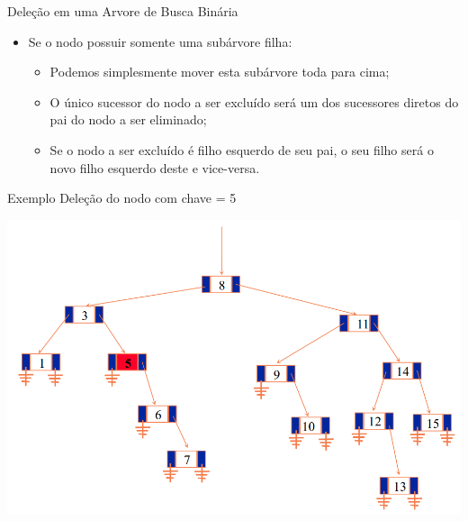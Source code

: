 \documentclass[12pt,table,xcolor={dvipsnames}]{beamer}
\begin{document}
\begin{frame}[fragile]{Deleção em uma Arvore de Busca Binária}
          \begin{itemize}
          \item Se o nodo possuir somente uma subárvore filha:
		  \begin{itemize}
		  \item Podemos simplesmente mover esta subárvore toda para cima;
		  \item O único sucessor do nodo a ser excluído será um dos sucessores diretos do pai do nodo a ser eliminado;
		  \item Se o nodo a ser excluído é filho esquerdo de seu pai, o seu filho será o novo filho esquerdo deste e vice-versa.
		  \end{itemize}
       	  \end{itemize}
\end{frame}

\begin{frame}[fragile]{Exemplo}
Deleção do nodo com chave = 5
\begin{center}
\includegraphics[scale=.3]{arv10.png} 
\end{center}
\end{frame}
\end{document}
